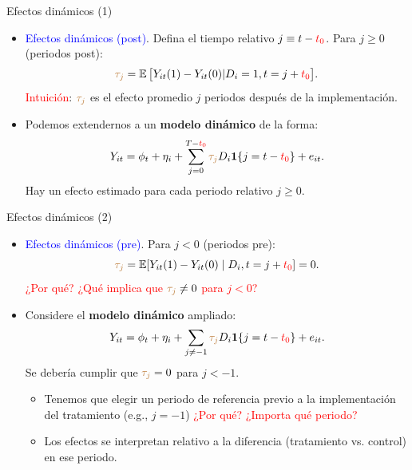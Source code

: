 \documentclass[10pt, xcolor=dvipsnames]{beamer}
\begin{document}
\begin{frame}{Efectos dinámicos (1)}
\begin{itemize}\setlength{\itemsep}{1.0em}
    \item[1.] \textcolor{blue}{Efectos dinámicos (post)}. Defina el tiempo relativo \(j \equiv t-\textcolor{red}{t_0}\).
    Para \(j \ge 0\) (periodos post):
    \[
        \textcolor{brown}{\tau_j} = \operatorname{\mathbb{E}} \big[ Y_{it}(1)-Y_{it}(0) | D_i=1, t= j + \textcolor{red}{t_0}\big].
    \]
    \textcolor{red}{Intuición}: \(\textcolor{brown}{\tau_j}\) es el efecto promedio \(j\) periodos después de la implementación. %
    \item Podemos extendernos a un \textbf{modelo dinámico} de la forma:
    \begin{align*}
        Y_{it} = \phi_t + \eta_i + \sum_{j=0}^{T - \textcolor{red}{t_0}} \textcolor{brown}{\tau_j} D_i \mathbf{1}\{j=t-\textcolor{red}{t_0}\} + e_{it}.
    \end{align*}        
    Hay un efecto estimado para cada periodo relativo \(j \geq 0\).
\end{itemize}
\end{frame}


\begin{frame}{Efectos dinámicos (2)}
    \begin{itemize}\setlength{\itemsep}{1.0em}
        \item[2.] \textcolor{blue}{Efectos dinámicos (pre)}. Para \(j < 0\) (periodos pre):
        \[
        \textcolor{brown}{\tau_j} = \operatorname{\mathbb{E}}[Y_{it}(1)- Y_{it}(0) \mid D_{i}, t= j + \textcolor{red}{t_0}] = 0.
        \]
        \textcolor{red}{¿Por qué?} \textcolor{red}{¿Qué implica que \(\textcolor{brown}{\tau_j} \neq 0\) para \(j < 0\)?}
        \item Considere el \textbf{modelo dinámico} ampliado:
		\begin{align*}
			Y_{it} = \phi_t + \eta_i + \sum_{j \neq -1} \textcolor{brown}{\tau_j} D_i \mathbf{1}\{j=t-\textcolor{red}{t_0}\} + e_{it}.
		\end{align*}
        Se debería cumplir que \(\textcolor{brown}{\tau_j} = 0\) para \(j < -1\).
        \vspace{0.5em}
        \begin{itemize}\setlength{\itemsep}{0.3em}
            \item Tenemos que elegir un periodo de referencia previo a la implementación del tratamiento (e.g., $j = - 1$) \textcolor{red}{¿Por qué?} \textcolor{red}{¿Importa qué periodo?} %
            \item Los efectos se interpretan relativo a la diferencia (tratamiento vs. control) en ese periodo.
        \end{itemize}
    \end{itemize}   
\end{frame}
\end{document}
